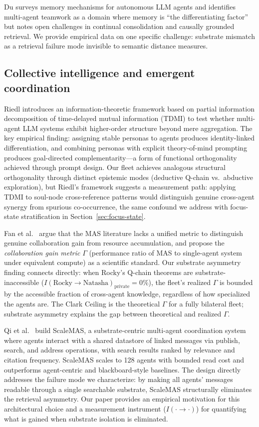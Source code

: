 \documentclass[11pt]{article}
\begin{document}
Du \citep{du2026survey} surveys memory mechanisms for autonomous LLM agents and
identifies multi-agent teamwork as a domain where memory is ``the differentiating
factor'' but notes open challenges in continual consolidation and causally grounded
retrieval. We provide empirical data on one specific challenge: substrate mismatch
as a retrieval failure mode invisible to semantic distance measures.

\subsection{Collective intelligence and emergent coordination}

Riedl \citep{riedl2026emergent} introduces an information-theoretic framework
based on partial information decomposition of time-delayed mutual information
(TDMI) to test whether multi-agent LLM systems exhibit higher-order structure
beyond mere aggregation. The key empirical finding: assigning stable personas to
agents produces identity-linked differentiation, and combining personas with
explicit theory-of-mind prompting produces goal-directed complementarity---a form
of functional orthogonality achieved through prompt design. Our fleet achieves
analogous structural orthogonality through distinct epistemic modes (deductive
Q-chain vs.\ abductive exploration), but Riedl's framework suggests a measurement
path: applying TDMI to soul-node cross-reference patterns would distinguish
genuine cross-agent synergy from spurious co-occurrence, the same confound we
address with focus-state stratification in Section~\ref{sec:focus-state}.

Fan et al.\ \citep{fan2026science} argue that the MAS literature lacks a unified
metric to distinguish genuine collaboration gain from resource accumulation, and
propose the \emph{collaboration gain metric} $\Gamma$ (performance ratio of MAS
to single-agent system under equivalent compute) as a scientific standard. Our
substrate asymmetry finding connects directly: when Rocky's Q-chain theorems
are substrate-inaccessible ($I(\text{Rocky}\to\text{Natasha})_{\text{private}} = 0\%$),
the fleet's realized $\Gamma$ is bounded by the accessible fraction of cross-agent
knowledge, regardless of how specialized the agents are. The Clark Ceiling is the
theoretical $\Gamma$ for a fully bilateral fleet; substrate asymmetry explains the
gap between theoretical and realized $\Gamma$.

Qi et al.\ \citep{qi2026scalemas} build ScaleMAS, a substrate-centric multi-agent
coordination system where agents interact with a shared datastore of linked messages
via publish, search, and address operations, with search results ranked by relevance
and citation frequency. ScaleMAS scales to 128 agents with bounded read cost and
outperforms agent-centric and blackboard-style baselines. The design directly
addresses the failure mode we characterize: by making all agents' messages readable
through a single searchable substrate, ScaleMAS structurally eliminates the retrieval
asymmetry. Our paper provides an empirical motivation for this architectural choice
and a measurement instrument ($I(\cdot\to\cdot)$) for quantifying what is gained
when substrate isolation is eliminated.
\end{document}
